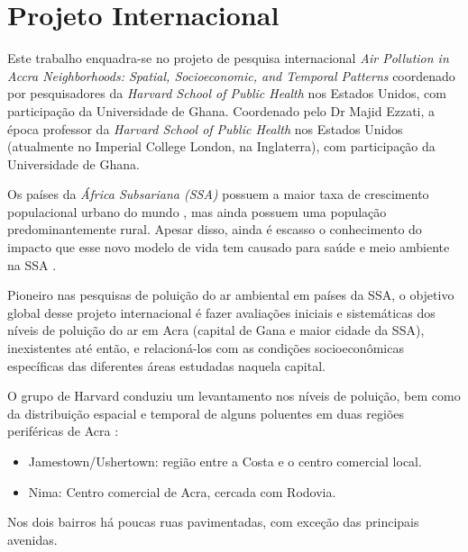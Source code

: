 
\section{Projeto Internacional}

Este trabalho enquadra-se no projeto de pesquisa internacional 
\textit{Air Pollution in Accra Neighborhoods: Spatial, Socioeconomic, and Temporal Patterns} 
coordenado por pesquisadores da \textit{Harvard School of Public Health} nos Estados Unidos, 
com participação da Universidade de Ghana. 
Coordenado pelo Dr Majid Ezzati, a época professor da \textit{Harvard School of Public Health} 
nos Estados Unidos (atualmente no Imperial College London, na Inglaterra), com participação 
da Universidade de Ghana. 

Os países da \textit{África Subsariana (SSA)} possuem a maior taxa de crescimento 
populacional urbano do mundo \cite{united2006world}, mas ainda possuem uma população 
predominantemente rural. 
Apesar disso, ainda é escasso o conhecimento do impacto que esse novo modelo de vida 
tem causado para saúde e meio ambiente na SSA \cite{cohen2004urban}. 

Pioneiro nas pesquisas de poluição do ar ambiental em países da SSA, o objetivo 
global desse projeto internacional é fazer avaliações iniciais e sistemáticas 
dos níveis de poluição do ar em Acra (capital de Gana e maior cidade da SSA), 
inexistentes até então, e relacioná-los com as condições socioeconômicas 
específicas das diferentes áreas estudadas naquela capital.

O grupo de Harvard \citep{ARKU2008} conduziu um levantamento nos níveis de 
poluição, bem como da distribuição espacial e temporal de alguns poluentes 
em duas regiões periféricas de Acra \citep{DIONISIO2010}:



\begin{itemize}
  \item Jamestown/Ushertown: região entre a Costa e o centro comercial local.
  \item Nima: Centro comercial de Acra, cercada com Rodovia.
\end{itemize} 

Nos dois bairros há poucas ruas pavimentadas, com exceção das principais 
avenidas.
